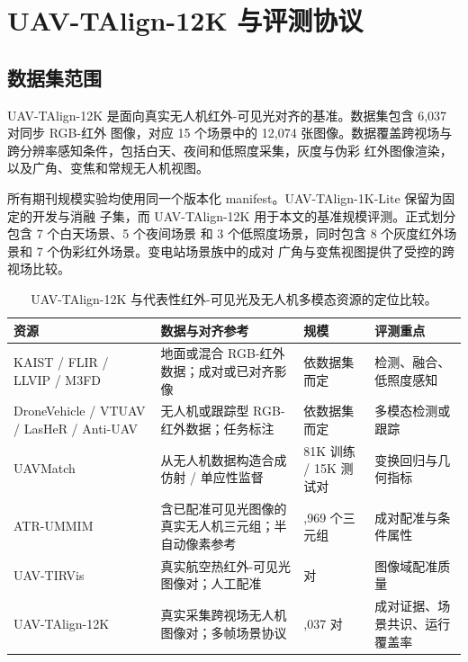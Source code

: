 
\section{UAV-TAlign-12K 与评测协议}

\subsection{数据集范围}

UAV-TAlign-12K 是面向真实无人机红外-可见光对齐的基准。数据集包含 6,037 对同步 RGB-红外
图像，对应 15 个场景中的 12,074 张图像。数据覆盖跨视场与跨分辨率感知条件，包括白天、夜间和低照度采集，灰度与伪彩
红外图像渲染，以及广角、变焦和常规无人机视图。

所有期刊规模实验均使用同一个版本化 manifest。UAV-TAlign-1K-Lite 保留为固定的开发与消融
子集，而 UAV-TAlign-12K 用于本文的基准规模评测。正式划分包含 7 个白天场景、5 个夜间场景
和 3 个低照度场景，同时包含 8 个灰度红外场景和 7 个伪彩红外场景。变电站场景族中的成对
广角与变焦视图提供了受控的跨视场比较。

\begin{table}[t]
\caption{UAV-TAlign-12K 与代表性红外-可见光及无人机多模态资源的定位比较。}
\label{tab:dataset_positioning_zh}
\centering
\manuscripttablestyle
\begin{tabularx}{\textwidth}{@{}>{\raggedright\arraybackslash}p{2.6cm}>{\raggedright\arraybackslash}X>{\raggedright\arraybackslash}p{1.8cm}>{\raggedright\arraybackslash}X@{}}
\toprule
资源 & 数据与对齐参考 & 规模 & 评测重点 \\
\midrule
KAIST / FLIR / LLVIP / M3FD & 地面或混合 RGB-红外数据；成对或已对齐影像 & 依数据集而定 & 检测、融合、低照度感知 \\
\addlinespace
DroneVehicle / VTUAV / LasHeR / Anti-UAV & 无人机或跟踪型 RGB-红外数据；任务标注 & 依数据集而定 & 多模态检测或跟踪 \\
\addlinespace
UAVMatch~\cite{gao2025uavmatch} & 从无人机数据构造合成仿射 / 单应性监督 & 81K 训练 / 15K 测试对 & 变换回归与几何指标 \\
\addlinespace
ATR-UMMIM~\cite{bin2025atrummim} & 含已配准可见光图像的真实无人机三元组；半自动像素参考 & 7,969 个三元组 & 成对配准与条件属性 \\
\addlinespace
UAV-TIRVis~\cite{vasile2025uavtirvis} & 真实航空热红外-可见光图像对；人工配准 & 80 对 & 图像域配准质量 \\
\addlinespace
UAV-TAlign-12K & 真实采集跨视场无人机图像对；多帧场景协议 & 6,037 对 & 成对证据、场景共识、运行覆盖率 \\
\bottomrule
\end{tabularx}
\end{table}

